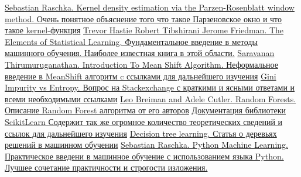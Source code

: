 \documentclass[11pt]{article}
\begin{document}
\begin{thebibliography}{}
     \href{http://sebastianraschka.com/Articles/2014_kernel_density_est.html}{ Sebastian Raschka. Kernel density estimation via the Parzen-Rosenblatt window method. Очень понятное объяснение того что такое Парзеновское окно и что такое kernel-функция}
     \href{https://web.stanford.edu/~hastie/ElemStatLearn/} {Trevor Hastie Robert Tibshirani Jerome Friedman. The Elements of Statistical Learning.  Фундаментальное введение в методы машинного обучения. Наиболее известная книга в этой области.}
     \href{https://saravananthirumuruganathan.wordpress.com/about/} { Saravanan Thirumuruganathan. Introduction To Mean Shift Algorithm. Неформальное введение в MeanShift алгоритм c ссылками для дальнейшего изучения}
     \href{https://datascience.stackexchange.com/questions/10228/gini-impurity-vs-entropy} {Gini Impurity vs Entropy. Вопрос на Stackexchange с краткими и ясными ответами и всеми необходимыми ссылками}
     \href{https://www.stat.berkeley.edu/~breiman/RandomForests/cc_home.htm} {Leo Breiman and Adele Cutler. Random Forests. Описание Random Forest алгоритма от его авторов}
     \href{http://scikit-learn.org/stable/documentation.html} {Документация библиотеки ScikitLearn Содержит так же огромное количество теоретических сведений и ссылок для дальнейшего изучения}
     \href{https://en.wikipedia.org/wiki/Decision_tree_learning} {Decision tree learning. Статья о деревьях решений в машинном обучении}
     \href{https://www.amazon.com/Python-Machine-Learning-Sebastian-Raschka/dp/1783555130} {  Sebastian Raschka. Python Machine Learning. Практическое введени в машинное обучение с использованием языка Python. Лучшее сочетание практичности и строгости изложения.}
\end{thebibliography}


    
    
    
    
\end{document}
